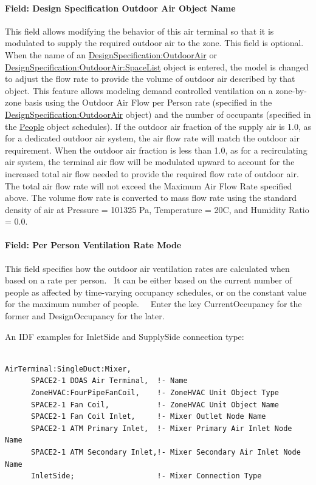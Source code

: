 \paragraph{Field: Design Specification Outdoor Air Object Name}\label{field-DSOA-object-name}

This field allows modifying the behavior of this air terminal so that it is modulated to supply the required outdoor air to the zone.  This field is optional. When the name of an \hyperref[designspecificationoutdoorair]{DesignSpecification:OutdoorAir} or \hyperref[designspecificationoutdoorairspacelist]{DesignSpecification:OutdoorAir:SpaceList} object is entered, the model is changed to adjust the flow rate to provide the volume of outdoor air described by that object.  This feature allows modeling demand controlled ventilation on a zone-by-zone basis using the Outdoor Air Flow per Person rate (specified in the \hyperref[designspecificationoutdoorair]{DesignSpecification:OutdoorAir} object) and the number of occupants (specified in the \hyperref[people]{People} object schedules).  If the outdoor air fraction of the supply air is 1.0, as for a dedicated outdoor air system, the air flow rate will match the outdoor air requirement.  When the outdoor air fraction is less than 1.0, as for a recirculating air system, the terminal air flow will be modulated upward to account for the increased total air flow needed to provide the required flow rate of outdoor air.   The total air flow rate will not exceed the Maximum Air Flow Rate specified above. The volume flow rate is converted to mass flow rate using the standard density of air at Pressure = 101325 Pa, Temperature = 20C, and Humidity Ratio = 0.0.

\paragraph{Field: Per Person Ventilation Rate Mode}

This field specifies how the outdoor air ventilation rates are calculated when based on a rate per person.~ It can be either based on the current number of people as affected by time-varying occupancy schedules, or on the constant value for the maximum number of people.~~ Enter the key CurrentOccupancy for the former and DesignOccupancy for the later.

An IDF examples for InletSide and SupplySide connection type:

\begin{lstlisting}

AirTerminal:SingleDuct:Mixer,
      SPACE2-1 DOAS Air Terminal,  !- Name
      ZoneHVAC:FourPipeFanCoil,    !- ZoneHVAC Unit Object Type
      SPACE2-1 Fan Coil,           !- ZoneHVAC Unit Object Name
      SPACE2-1 Fan Coil Inlet,     !- Mixer Outlet Node Name
      SPACE2-1 ATM Primary Inlet,  !- Mixer Primary Air Inlet Node Name
      SPACE2-1 ATM Secondary Inlet,!- Mixer Secondary Air Inlet Node Name
      InletSide;                   !- Mixer Connection Type
\end{lstlisting}

